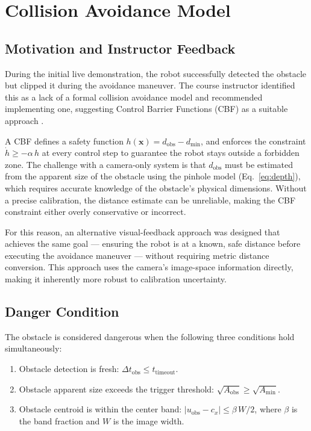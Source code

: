 \documentclass[journal, 10pt]{IEEEtran}
\begin{document}
\section{Collision Avoidance Model}
\label{sec:avoidance}

\subsection{Motivation and Instructor Feedback}

During the initial live demonstration, the robot successfully detected the
obstacle but clipped it during the avoidance maneuver. The course
instructor identified this as a lack of a formal collision avoidance model
and recommended implementing one, suggesting Control Barrier Functions
(CBF) as a suitable approach \cite{ames2017}.

A CBF defines a safety function $h(\mathbf{x}) = d_{\text{obs}} -
d_{\min}$, and enforces the constraint $\dot{h} \geq -\alpha\, h$ at every
control step to guarantee the robot stays outside a forbidden zone. The
challenge with a camera-only system is that $d_{\text{obs}}$ must be
estimated from the apparent size of the obstacle using the pinhole model
(Eq.~\ref{eq:depth}), which requires accurate knowledge of the obstacle's
physical dimensions. Without a precise calibration, the distance estimate
can be unreliable, making the CBF constraint either overly conservative or
incorrect.

For this reason, an alternative visual-feedback approach was designed that
achieves the same goal --- ensuring the robot is at a known, safe distance
before executing the avoidance maneuver --- without requiring metric
distance conversion. This approach uses the camera's image-space
information directly, making it inherently more robust to calibration
uncertainty.

\subsection{Danger Condition}

The obstacle is considered dangerous when the following three conditions
hold simultaneously:

\begin{enumerate}
  \item Obstacle detection is fresh: $\Delta t_{\text{obs}} \leq
        t_{\text{timeout}}$.
  \item Obstacle apparent size exceeds the trigger threshold:
        $\sqrt{A_{\text{obs}}} \geq \sqrt{A_{\min}}$.
  \item Obstacle centroid is within the center band:
        $|u_{\text{obs}} - c_x| \leq \beta\, W/2$, where $\beta$ is the
        band fraction and $W$ is the image width.
\end{enumerate}
\end{document}
